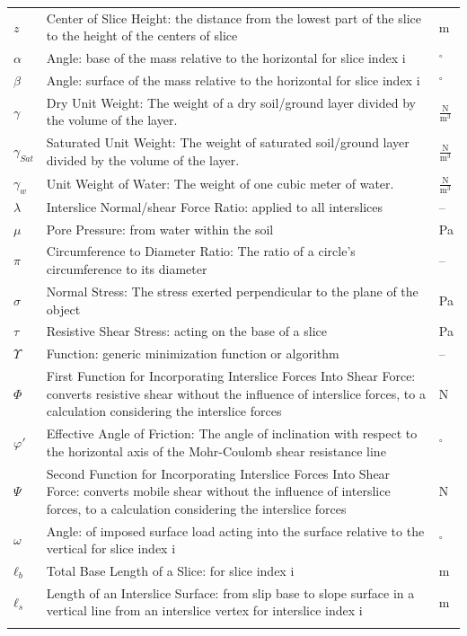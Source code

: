 \documentclass[12pt]{article}
\begin{document}
\begin{longtabu}{l X[l] l}
\\
$z$ & Center of Slice Height: the distance from the lowest part of the slice to the height of the centers of slice & m
\\
$α$ & Angle: base of the mass relative to the horizontal for slice index i & ${}^{\circ}$
\\
$β$ & Angle: surface of the mass relative to the horizontal for slice index i & ${}^{\circ}$
\\
$γ$ & Dry Unit Weight: The weight of a dry soil/ground layer divided by the volume of the layer. & $\frac{\text{N}}{\text{m}^{3}}$
\\
${γ_{Sat}}$ & Saturated Unit Weight: The weight of saturated soil/ground layer divided by the volume of the layer. & $\frac{\text{N}}{\text{m}^{3}}$
\\
${γ_{w}}$ & Unit Weight of Water: The weight of one cubic meter of water. & $\frac{\text{N}}{\text{m}^{3}}$
\\
$λ$ & Interslice Normal/shear Force Ratio: applied to all interslices & --
\\
$μ$ & Pore Pressure: from water within the soil & Pa
\\
$π$ & Circumference to Diameter Ratio: The ratio of a circle's circumference to its diameter & --
\\
$σ$ & Normal Stress: The stress exerted perpendicular to the plane of the object & Pa
\\
$τ$ & Resistive Shear Stress: acting on the base of a slice & Pa
\\
$Υ$ & Function: generic minimization function or algorithm & --
\\
$Φ$ & First Function for Incorporating Interslice Forces Into Shear Force: converts resistive shear without the influence of interslice forces, to a calculation considering the interslice forces & N
\\
$φ'$ & Effective Angle of Friction: The angle of inclination with respect to the horizontal axis of the Mohr-Coulomb shear resistance line & ${}^{\circ}$
\\
$Ψ$ & Second Function for Incorporating Interslice Forces Into Shear Force: converts mobile shear without the influence of interslice forces, to a calculation considering the interslice forces & N
\\
$ω$ & Angle: of imposed surface load acting into the surface relative to the vertical for slice index i & ${}^{\circ}$
\\
${ℓ_{b}}$ & Total Base Length of a Slice: for slice index i & m
\\
${ℓ_{s}}$ & Length of an Interslice Surface: from slip base to slope surface in a vertical line from an interslice vertex for interslice index i & m
\\
\bottomrule
\label{Table:ToS}
\end{longtabu}
\end{document}
